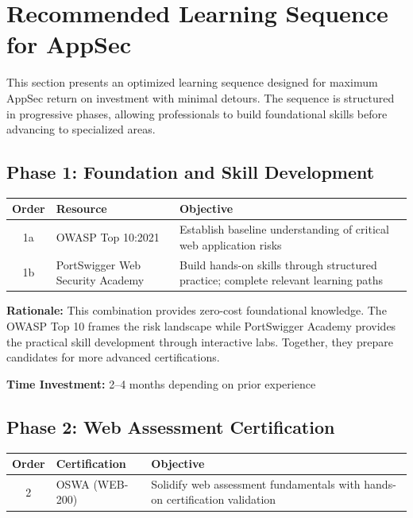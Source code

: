 \documentclass[11pt,letterpaper]{article}
\begin{document}
\section{Recommended Learning Sequence for AppSec}

This section presents an optimized learning sequence designed for maximum AppSec return on investment with minimal detours. The sequence is structured in progressive phases, allowing professionals to build foundational skills before advancing to specialized areas.

\subsection{Phase 1: Foundation and Skill Development}

\begin{table}[H]
\centering
\begin{tabularx}{\textwidth}{c l >{\raggedright\arraybackslash}X}
\toprule
\textbf{Order} & \textbf{Resource} & \textbf{Objective} \\
\midrule
1a & OWASP Top 10:2021 & Establish baseline understanding of critical web application risks \\
\midrule
1b & PortSwigger Web Security Academy & Build hands-on skills through structured practice; complete relevant learning paths \\
\bottomrule
\end{tabularx}
\end{table}

\textbf{Rationale:} This combination provides zero-cost foundational knowledge. The OWASP Top 10 frames the risk landscape while PortSwigger Academy provides the practical skill development through interactive labs. Together, they prepare candidates for more advanced certifications.

\textbf{Time Investment:} 2--4 months depending on prior experience

\subsection{Phase 2: Web Assessment Certification}

\begin{table}[H]
\centering
\begin{tabularx}{\textwidth}{c l >{\raggedright\arraybackslash}X}
\toprule
\textbf{Order} & \textbf{Certification} & \textbf{Objective} \\
\midrule
2 & OSWA (WEB-200) & Solidify web assessment fundamentals with hands-on certification validation \\
\bottomrule
\end{tabularx}
\end{table}
\end{document}
